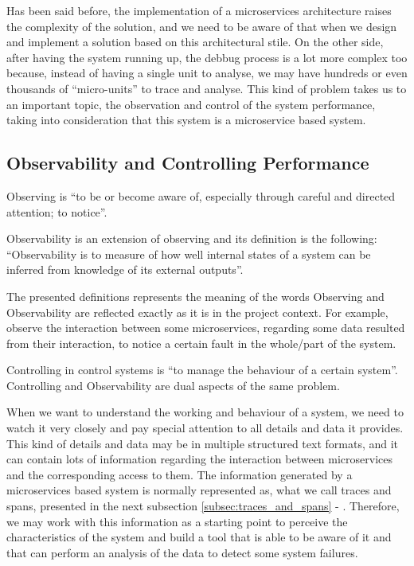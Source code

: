 Has been said before, the implementation of a microservices architecture raises the complexity of the solution, and we need to be aware of that when we design and implement a solution based on this architectural stile. On the other side, after having the system running up, the debbug process is a lot more complex too because, instead of having a single unit to analyse, we may have hundreds or even thousands of ``micro-units'' to trace and analyse. This kind of problem takes us to an important topic, the observation and control of the system performance, taking into consideration that this system is a microservice based system.

\subsection{Observability and Controlling Performance}
\label{subsec:observability_and_controlling_performance}

Observing is ``to be or become aware of, especially through careful and directed attention; to notice''\cite{observing_definition}.

Observability is an extension of observing and its definition is the following: ``Observability is to measure of how well internal states of a system can be inferred from knowledge of its external outputs''\cite{observability}.

The presented definitions represents the meaning of the words Observing and Observability are reflected exactly as it is in the project context. For example, observe the interaction between some microservices, regarding some data resulted from their interaction, to notice a certain fault in the whole/part of the system.

Controlling in control systems is ``to manage the behaviour of a certain system''\cite{control_systems}. Controlling and Observability are dual aspects of the same problem\cite{observability}.

When we want to understand the working and behaviour of a system, we need to watch it very closely and pay special attention to all details and data it provides. This kind of details and data may be in multiple structured text formats, and it can contain lots of information regarding the interaction between microservices and the corresponding access to them. The information generated by a microservices based system is normally represented as, what we call traces and spans, presented in the next subsection \ref{subsec:traces_and_spans} - . Therefore, we may work with this information as a starting point to perceive the characteristics of the system and build a tool that is able to be aware of it and that can perform an analysis of the data to detect some system failures.

